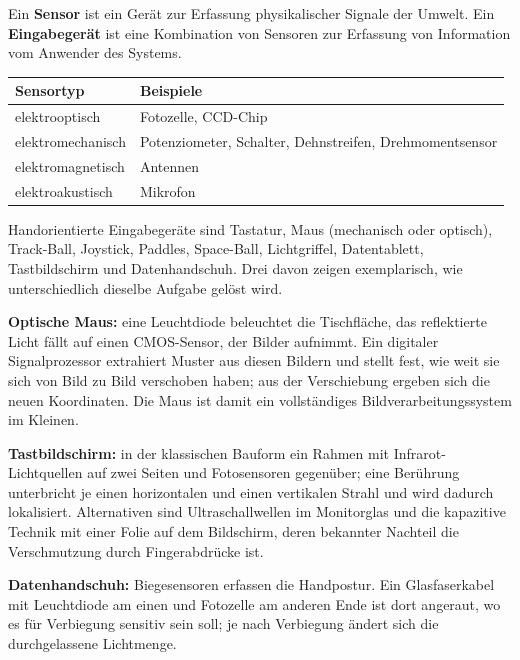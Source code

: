 \documentclass[12pt, a4paper]{article}
\begin{document}
\begin{definitionbox}
Ein \textbf{Sensor} ist ein Gerät zur Erfassung physikalischer Signale der Umwelt.
Ein \textbf{Eingabegerät} ist eine Kombination von Sensoren zur Erfassung von
Information vom Anwender des Systems.
\end{definitionbox}

\begin{center}
\begin{tabular}{@{}p{4.6cm}p{8.4cm}@{}}
\toprule
\textbf{Sensortyp} & \textbf{Beispiele} \\
\midrule
elektrooptisch & Fotozelle, CCD-Chip \\
elektromechanisch & Potenziometer, Schalter, Dehnstreifen, Drehmomentsensor \\
elektromagnetisch & Antennen \\
elektroakustisch & Mikrofon \\
\bottomrule
\end{tabular}
\end{center}

Handorientierte Eingabegeräte sind Tastatur, Maus (mechanisch oder optisch),
Track-Ball, Joystick, Paddles, Space-Ball, Lichtgriffel, Datentablett, Tastbildschirm
und Datenhandschuh. Drei davon zeigen exemplarisch, wie unterschiedlich dieselbe
Aufgabe gelöst wird.

\textbf{Optische Maus:} eine Leuchtdiode beleuchtet die Tischfläche, das reflektierte
Licht fällt auf einen CMOS-Sensor, der Bilder aufnimmt. Ein digitaler Signalprozessor
extrahiert Muster aus diesen Bildern und stellt fest, wie weit sie sich von Bild zu
Bild verschoben haben; aus der Verschiebung ergeben sich die neuen Koordinaten. Die
Maus ist damit ein vollständiges Bildverarbeitungssystem im Kleinen.

\textbf{Tastbildschirm:} in der klassischen Bauform ein Rahmen mit Infrarot-Lichtquellen
auf zwei Seiten und Fotosensoren gegenüber; eine Berührung unterbricht je einen
horizontalen und einen vertikalen Strahl und wird dadurch lokalisiert. Alternativen sind
Ultraschallwellen im Monitorglas und die kapazitive Technik mit einer Folie auf dem
Bildschirm, deren bekannter Nachteil die Verschmutzung durch Fingerabdrücke ist.

\textbf{Datenhandschuh:} Biegesensoren erfassen die Handpostur. Ein Glasfaserkabel mit
Leuchtdiode am einen und Fotozelle am anderen Ende ist dort angeraut, wo es für
Verbiegung sensitiv sein soll; je nach Verbiegung ändert sich die durchgelassene
Lichtmenge.
\end{document}
